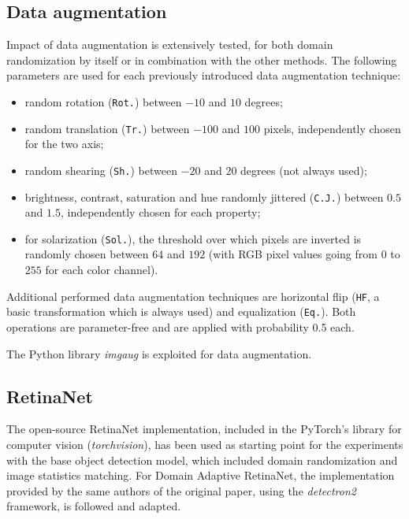 \documentclass[%
    corpo=12pt,
    twoside,
    stile=classica,   
    tipotesi=magistrale,
    evenboxes,
    english,
	numerazioneromana,
]{toptesi}
\begin{document}
\subsection{Data augmentation}
Impact of data augmentation is extensively tested, for both domain randomization by itself or in combination with the other methods. The following parameters are used for each previously introduced data augmentation technique:
\begin{itemize}
	\item random rotation (\texttt{Rot.}) between $ -10 $ and $ 10 $ degrees;
	\item random translation (\texttt{Tr.}) between $ -100 $ and $ 100 $ pixels, independently chosen for the two axis;
	\item random shearing (\texttt{Sh.}) between $-20$ and $20$ degrees (not always used);
	\item brightness, contrast, saturation and hue randomly jittered (\texttt{C.J.}) between $ 0.5 $ and $ 1.5 $, independently chosen for each property;
	\item for solarization (\texttt{Sol.}), the threshold over which pixels are inverted is randomly chosen between $ 64 $ and $ 192 $ (with RGB pixel values going from $ 0 $ to $ 255 $ for each color channel).
\end{itemize}

Additional performed data augmentation techniques are horizontal flip (\texttt{HF}, a basic transformation which is always used) and equalization (\texttt{Eq.}). Both operations are parameter-free and are applied with probability 0.5 each.

\bigskip
The Python library \textit{imgaug}\cite{imgaug} is exploited for data augmentation.

\subsection{RetinaNet}
The open-source RetinaNet implementation, included in the PyTorch's library for computer vision (\textit{torchvision})\cite{torchvision_retinanet}, has been used as starting point for the experiments with the base object detection model, which included domain randomization and image statistics matching. For Domain Adaptive RetinaNet, the implementation provided by the same authors of the original paper\cite{pasqualino2020unsupervised}, using the \textit{detectron2} framework\cite{wu2019detectron2}\cite{daretinanet_github}, is followed and adapted.
\end{document}

